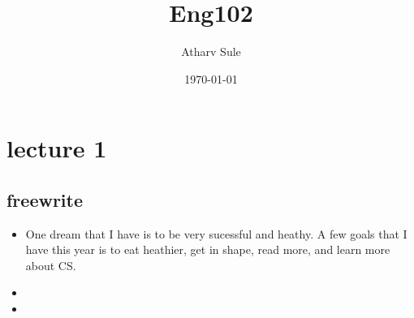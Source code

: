 \documentclass[11pt]{article}
\author{Atharv Sule}
\date{\today}
\title{Eng102}
\begin{document}
\maketitle

\section{lecture 1}
\label{sec:org47d597e}

\subsection{freewrite}
\label{sec:org4fd0594}
\begin{itemize}
\item One dream that I have is to be very sucessful and heathy.
A few goals that I have this year is to eat heathier, get in shape,
read more, and learn more about CS.
\item 

\item 
\end{itemize}
\end{document}
